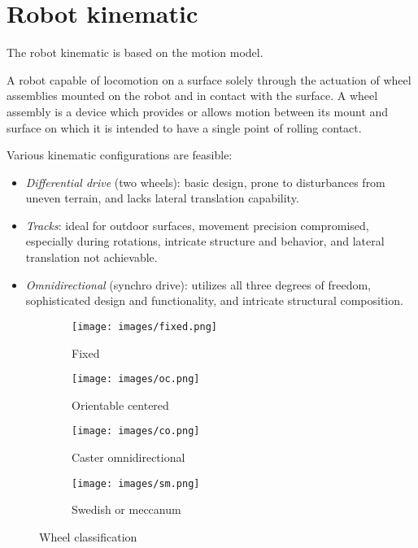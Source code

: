 \section{Robot kinematic}

The robot kinematic is based on the motion model. 
\begin{definition}
    A robot capable of locomotion on a surface solely through the actuation of wheel assemblies mounted on the robot and in contact with the surface. 
    A wheel assembly is a device which provides or allows motion between its mount and surface on which it is intended to have a single point of rolling contact.
\end{definition}

Various kinematic configurations are feasible:
\begin{itemize}
    \item \textit{Differential drive} (two wheels): basic design, prone to disturbances from uneven terrain, and lacks lateral translation capability.
    \item \textit{Tracks}: ideal for outdoor surfaces, movement precision compromised, especially during rotations, intricate structure and behavior, and lateral translation not achievable.
    \item \textit{Omnidirectional} (synchro drive): utilizes all three degrees of freedom, sophisticated design and functionality, and intricate structural composition.
\end{itemize}
\begin{figure}[H]
    \centering
    \begin{subfigure}{0.4\textwidth}
        \centering
        \texttt{[image: images/fixed.png]} 
        \caption{Fixed}
    \end{subfigure}
    \begin{subfigure}{0.4\textwidth}
        \centering
        \texttt{[image: images/oc.png]}
        \caption{Orientable centered}
    \end{subfigure}
    \begin{subfigure}{0.4\textwidth}
        \centering
        \texttt{[image: images/co.png]} 
        \caption{Caster omnidirectional}
    \end{subfigure}
    \begin{subfigure}{0.4\textwidth}
        \centering
        \texttt{[image: images/sm.png]}
        \caption{Swedish or meccanum}
    \end{subfigure}
    \caption{Wheel classification}
\end{figure}

